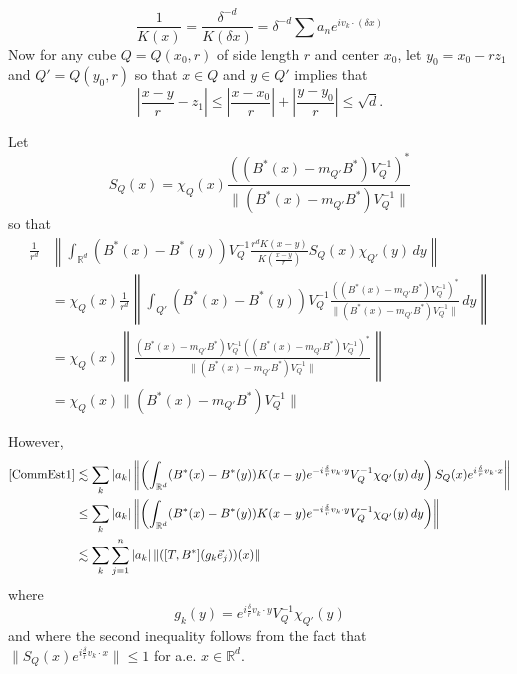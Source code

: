 \documentclass[12pt,reqno ]{amsart}
\numberwithin{equation}{section}
\theoremstyle{definition}
\newcommand{\Rd}{\ensuremath{\mathbb{R}^d}}
\newcommand{\inrd}{\ensuremath{\int_{\Rd}}}
\begin{document}
\begin{equation*} \frac{1}{K(x)} = \frac{\delta^{-d}}{K(\delta x)} = \delta^{-d} \sum a_n e^{i v_k \cdot (\delta x)} \end{equation*} \noindent Now for any cube $Q = Q(x_0, r)$ of side length $r$ and center $x_0$, let $y_0 = x_0 - rz_1$ and $Q' = Q(y_0, r)$ so that $x \in Q$ and $y \in Q'$ implies that \begin{equation*} \left|\frac{x - y}{r} - z_1\right|  \leq \left| \frac{x - x_0}{r} \right| + \left| \frac{y - y_0}{r} \right|\leq \sqrt{d}. \end{equation*}

Let \begin{equation*} S_Q (x) = \chi_Q (x) \frac{((B^*(x) - m_{Q'} B^* ) V_Q ^{-1} )^* } {\| (B^*(x) - m_{Q'} B^* ) V_Q ^{-1} \|} \end{equation*}  so that \begin{align}\frac{1}{r^d} &  \left\|\inrd  (B^*(x) - B^*(y)) V_Q ^{-1} \frac{r^d K(x - y)}{K(\frac{x-y}{r})}  S_Q (x)  \chi_{Q'} (y) \, dy  \right\| \label{CommEst1} \\ & = \chi_Q (x)  \frac{1}{r^d} \left\| \int_{Q'}   (B^*(x) - B^*(y)) V_Q ^{-1}  \frac{(  (B^*(x) - m_{Q'} B^* ) V_Q ^{-1}  )^* }{\|  (B^*(x) - m_{Q'} B^* ) V_Q ^{-1} \|}  \, dy \right\| \nonumber \\ & = \chi_Q (x) \left\|\frac{  (B^*(x) - m_{Q'} B^* ) V_Q ^{-1} (  (B^*(x) - m_{Q'} B^* ) V_Q ^{-1}  )^*}{\|   (B^*(x) - m_{Q'} B^* ) V_Q ^{-1}\|} \right\| \nonumber \\ & = \chi_Q (x) \| (B^*(x) - m_{Q'} B^* ) V_Q ^{-1}\| \nonumber \end{align}

However, \begin{align*} \eqref{CommEst1} &  \lesssim \sum_k |a_k| \left\|  \left(\inrd (B^*(x) - B^*(y)) K(x - y)  e^{- i \frac{\delta}{r} v_k \cdot y} V_Q ^{-1}  \chi_{Q'} (y) \, dy \right)S_Q (x)  e^{ i \frac{\delta}{r} v_k \cdot x} \right\|  \\ & \leq  \sum_k  |a_k| \left\|  \left(\inrd (B^*(x) - B^*(y)) K(x - y)  e^{- i \frac{\delta}{r} v_k \cdot y} V_Q ^{-1}  \chi_{Q'} (y) \, dy \right) \right\|
 \\ & \lesssim  \sum_k  \sum_{j = 1}^n |a_k| \left\|  ([T, B^*] (g_k \vec{e}_j)) (x)  \right\| \end{align*} where \begin{equation*} g_k (y) =   e^{ i \frac{\delta}{r} v_k \cdot y } V_Q ^{-1} \chi_{Q'} (y) \end{equation*}  and where the second inequality follows from the fact that $\| S_Q(x)  e^{ i \frac{\delta}{r} v_k \cdot x }\| \leq 1$ for a.e. $x \in \Rd$.
\end{document}
